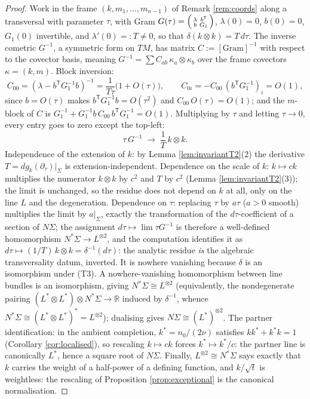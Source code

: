\documentclass[11pt]{article}
\theoremstyle{definition}
\newcommand{\R}{\mathbb{R}}
\newcommand{\shL}{L}
\newcommand{\Sig}{\Sigma}
\newcommand{\nO}{n_0}
\begin{document}
\begin{proof}
Work in the frame $(k, m_1, \dots, m_{n-1})$ of Remark \ref{rem:coords} along a transversal with parameter $\tau$, with Gram $G(\tau) = \begin{psmallmatrix} \lambda & b^{\mathsf T} \\ b & G_1 \end{psmallmatrix}$, $\lambda(0) = 0$, $b(0) = 0$, $G_1(0)$ invertible, and $\lambda'(0) =: T \neq 0$, so that $\delta(k \otimes k) = T\, d\tau$. The inverse cometric $G^{-1}$, a symmetric form on $TM$, has matrix $C := [\text{Gram}]^{-1}$ with respect to the covector basis, meaning $G^{-1} = \sum C_{ab}\, \kappa_a \otimes \kappa_b$ over the frame covectors $\kappa = (k, m)$. Block inversion:
\[
C_{00} = (\lambda - b^{\mathsf T} G_1^{-1} b)^{-1} = \frac{1}{T\tau}\bigl(1 + O(\tau)\bigr), \qquad
C_{0i} = -C_{00}\, (b^{\mathsf T} G_1^{-1})_i = O(1),
\]
since $b = O(\tau)$ makes $b^{\mathsf T} G_1^{-1} b = O(\tau^2)$ and $C_{00}\,O(\tau) = O(1)$; and the $m$-block of $C$ is $G_1^{-1} + G_1^{-1} b\, C_{00}\, b^{\mathsf T} G_1^{-1} = O(1)$. Multiplying by $\tau$ and letting $\tau \to 0$, every entry goes to zero except the top-left:
\[
\tau\, G^{-1} \;\longrightarrow\; \frac{1}{T}\, k \otimes k .
\]
Independence of the extension of $k$: by Lemma \ref{lem:invariantT2}(2) the derivative $T = dg_k(\partial_\tau)|_\Sig$ is extension-independent. Dependence on the scale of $k$: $k \mapsto ck$ multiplies the numerator $k \otimes k$ by $c^2$ and $T$ by $c^2$ (Lemma \ref{lem:invariantT2}(3)); the limit is unchanged, so the residue does not depend on $k$ at all, only on the line $\shL$ and the degeneration. Dependence on $\tau$: replacing $\tau$ by $a\tau$ ($a > 0$ smooth) multiplies the limit by $a|_\Sig$, exactly the transformation of the $d\tau$-coefficient of a section of $N\Sig$; the assignment $d\tau \mapsto \lim \tau G^{-1}$ is therefore a well-defined homomorphism $N^*\Sig \to \shL^{\otimes 2}$, and the computation identifies it as $d\tau \mapsto (1/T)\,k \otimes k = \delta^{-1}(d\tau)$: the analytic residue \emph{is} the algebraic transversality datum, inverted. It is nowhere vanishing because $\delta$ is an isomorphism under (T3). A nowhere-vanishing homomorphism between line bundles is an isomorphism, giving $N^*\Sig \cong \shL^{\otimes 2}$ (equivalently, the nondegenerate pairing $(\shL^* \otimes \shL^*) \otimes N^*\Sig \to \R$ induced by $\delta^{-1}$, whence $N^*\Sig \cong (\shL^* \otimes \shL^*)^* = \shL^{\otimes 2}$); dualising gives $N\Sig \cong (\shL^*)^{\otimes 2}$. The partner identification: in the ambient completion, $k^* = \nO/(2\nu)$ satisfies $kk^* + k^*k = 1$ (Corollary \ref{cor:localised}), so rescaling $k \mapsto ck$ forces $k^* \mapsto k^*/c$: the partner line is canonically $\shL^*$, hence a square root of $N\Sig$. Finally, $\shL^{\otimes 2} \cong N^*\Sig$ says exactly that $k$ carries the weight of a half-power of a defining function, and $k/\sqrt t$ is weightless: the rescaling of Proposition \ref{prop:exceptional} is the canonical normalisation.
\end{proof}
\end{document}
